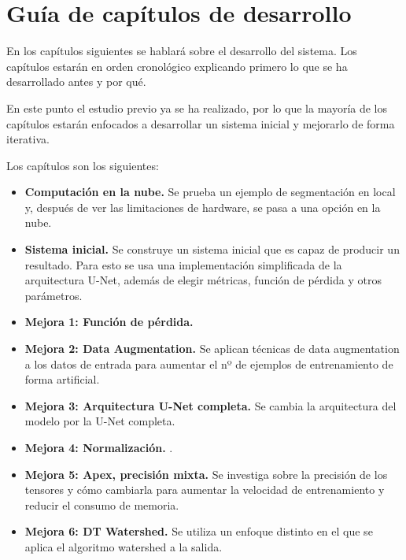 \chapter{Gu\'ia de cap\'itulos de desarrollo}\label{guiacapitulos}

En los capítulos siguientes se hablará sobre el desarrollo del sistema. Los capítulos estarán en orden cronológico explicando primero lo que se ha desarrollado antes y por qué.

En este punto el estudio previo ya se ha realizado, por lo que la mayoría de los capítulos estarán enfocados a desarrollar un sistema inicial y mejorarlo de forma iterativa. 

Los capítulos son los siguientes:

\begin{itemize}
\item \textbf{Computación en la nube.} Se prueba un ejemplo de segmentación en local y, después de ver las limitaciones de hardware, se pasa a una opción en la nube.
\item \textbf{Sistema inicial.} Se construye un sistema inicial que es capaz de producir un resultado. Para esto se usa una implementación simplificada de la arquitectura U-Net, además de elegir métricas, función de pérdida y otros parámetros.
\item \textbf{Mejora 1: Función de pérdida.} 
\item \textbf{Mejora 2: Data Augmentation.} Se aplican técnicas de data augmentation a los datos de entrada para aumentar el nº de ejemplos de entrenamiento de forma artificial.
\item \textbf{Mejora 3: Arquitectura U-Net completa.} Se cambia la arquitectura del modelo por la U-Net completa.
\item \textbf{Mejora 4: Normalización.} .
\item \textbf{Mejora 5: Apex, precisión mixta.} Se investiga sobre la precisión de los tensores y cómo cambiarla para aumentar la velocidad de entrenamiento y reducir el consumo de memoria.
\item \textbf{Mejora 6: DT Watershed.} Se utiliza un enfoque distinto en el que se aplica el algoritmo watershed a la salida.
\end{itemize}